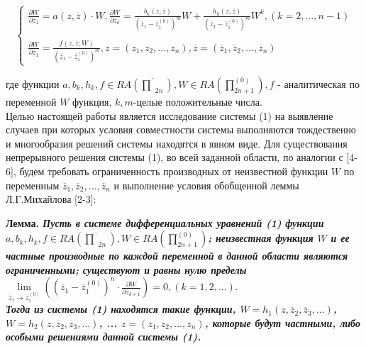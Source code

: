 \documentclass[11pt, a4paper]{article}
\begin{document}
	
	\begin{equation} \tag{1}
		\begin{cases} 
			\frac{\partial W}{\partial\overline{z}_1} = a(z, \overline{z}) \cdot W, \frac{\partial W}{\partial\overline{z}_k} = \frac{b_k(z, \overline{z})}{(\overline{z}_1 - \overline{z}_1 ^{(0)}) ^ m}W + \frac{h_k(z, \overline{z})}{(\overline{z}_1 - \overline{z}_1 ^{(0)}) ^ m} W^k, (k=2,...,n - 1)\\
			\\
			\frac{\partial W}{\partial\overline{z}_1} = \frac{f(z, \overline{z}; W)}{(\overline{z}_1 - \overline{z}_1 ^{(0)}) ^ m}, z=(z_1,z_2,...,z_n),\overline{z}=(\overline{z}_1,\overline{z}_2,...,\overline{z}_n)
		\end{cases}
	\end{equation}
	
	
	\noindent где функции $a, b_k, h_k, f \in RA(\overline{\prod}_{2n}), W \in RA(\prod_{2n+1}^{(0)}), f$ - аналитическая по переменной $W$ функция, $k,m$-целые положительные числа.\\
	
	Целью настоящей работы является исследование системы (1) на выявление случаев при которых условия совместности системы выполняются тождественно и многообразия решений системы находятся в явном виде. Для существования непрерывного решения системы (1), во всей заданной области, по аналогии с [4-6], будем требовать ограниченность производных от неизвестной функции $W$ по переменным $\overline{z}_1,\overline{z}_2,...,\overline{z}_n$  и выполнение условия обобщенной леммы Л.Г.Михайлова [2-3]:\\
	
	\vspace{6cm}
	
	\bf Лемма. \it Пусть в системе дифференциальных уравнений (1) функции $a, b_k, h_k, f \in RA(\overline{\prod}_{2n}), W \in RA(\prod_{2n+1}^{(0)})$; неизвестная функция $W$ и ее частные производные по каждой переменной в данной области являются ограниченными; существуют и равны нулю пределы\\
	
	$\lim\limits_{{\overline{z}_1 \to \overline{z}_1 ^{(0)}}} \left((\overline{z}_1 - \overline{z}_1 ^{(0)})^n \cdot \frac{\partial W}{\partial\overline{z}_{k+1}}\right) = 0, (k=1,2,...).$ \\
	
	\it Тогда из системы (1) находятся такие функции, $W=h_1(z, \overline{z}_2, \overline{z}_3, ...)$, $W=h_2(z, \overline{z}_2, \overline{z}_3, ...)$, ... $z=(z_1, z_2, ..., z_n)$, которые будут частными, либо особыми  решениями данной системы (1). \\
	
\end{document}
